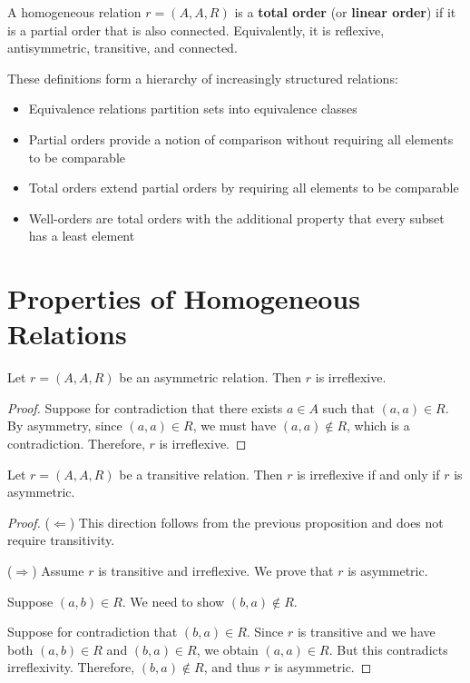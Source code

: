 \begin{definition}
A homogeneous relation $r = (A, A, R)$ is a \textbf{total order} (or \textbf{linear order}) if it is a partial order that is also connected. Equivalently, it is reflexive, antisymmetric, transitive, and connected.
\end{definition}

\begin{remark}
These definitions form a hierarchy of increasingly structured relations:
\begin{itemize}
    \item Equivalence relations partition sets into equivalence classes
    \item Partial orders provide a notion of comparison without requiring all elements to be comparable
    \item Total orders extend partial orders by requiring all elements to be comparable
    \item Well-orders are total orders with the additional property that every subset has a least element
\end{itemize}
\end{remark}

\section{Properties of Homogeneous Relations}

\begin{proposition}
Let $r = (A, A, R)$ be an asymmetric relation. Then $r$ is irreflexive.
\end{proposition}

\begin{proof}
Suppose for contradiction that there exists $a \in A$ such that $(a, a) \in R$. By asymmetry, since $(a, a) \in R$, we must have $(a, a) \notin R$, which is a contradiction. Therefore, $r$ is irreflexive.
\end{proof}

\begin{proposition}
Let $r = (A, A, R)$ be a transitive relation. Then $r$ is irreflexive if and only if $r$ is asymmetric.
\end{proposition}

\begin{proof}
($\Leftarrow$) This direction follows from the previous proposition and does not require transitivity.

($\Rightarrow$) Assume $r$ is transitive and irreflexive. We prove that $r$ is asymmetric.

Suppose $(a, b) \in R$. We need to show $(b, a) \notin R$.

Suppose for contradiction that $(b, a) \in R$. Since $r$ is transitive and we have both $(a, b) \in R$ and $(b, a) \in R$, we obtain $(a, a) \in R$. But this contradicts irreflexivity. Therefore, $(b, a) \notin R$, and thus $r$ is asymmetric.
\end{proof}

